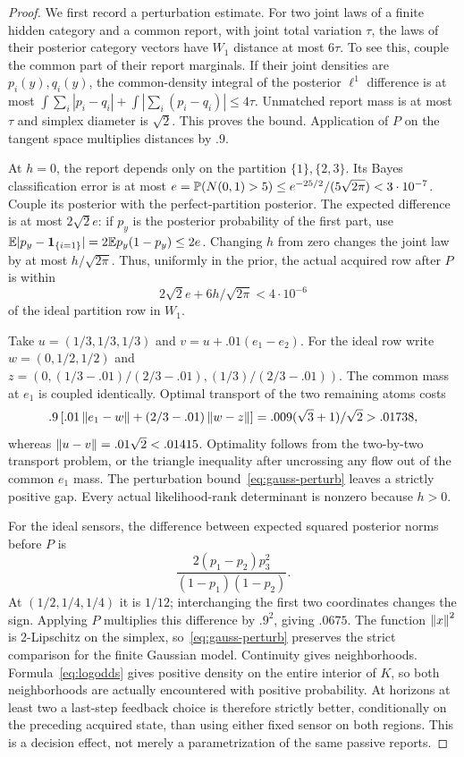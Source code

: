 \begin{proof}
We first record a perturbation estimate. For two joint laws of a finite hidden category and a common report, with joint total variation $\tau$, the laws of their posterior category vectors have $W_1$ distance at most $6\tau$. To see this, couple the common part of their report marginals. If their joint densities are $p_i(y),q_i(y)$, the common-density integral of the posterior $\ell^1$ difference is at most
$\int\sum_i|p_i-q_i|+\int|\sum_i(p_i-q_i)|\le4\tau$.
Unmatched report mass is at most $\tau$ and simplex diameter is $\sqrt2$. This proves the bound. Application of $P$ on the tangent space multiplies distances by $.9$.

At $h=0$, the report depends only on the partition $\{1\},\{2,3\}$. Its Bayes classification error is at most
$e=\mathbb P(N(0,1)>5)\le e^{-25/2}/(5\sqrt{2\pi})<3\cdot10^{-7}$.
Couple its posterior with the perfect-partition posterior. The expected difference is at most $2\sqrt2e$: if $p_y$ is the posterior probability of the first part, use $\mathbb E|p_y-\mathbf 1_{\{i=1\}}|=2\mathbb E p_y(1-p_y)\le2e$.
Changing $h$ from zero changes the joint law by at most $h/\sqrt{2\pi}$. Thus, uniformly in the prior, the actual acquired row after $P$ is within
\begin{equation}\label{eq:gauss-perturb}
 2\sqrt2 e+6h/\sqrt{2\pi}<4\cdot10^{-6}
\end{equation}
of the ideal partition row in $W_1$.

Take $u=(1/3,1/3,1/3)$ and $v=u+.01(e_1-e_2)$. For the ideal row write
$w=(0,1/2,1/2)$ and
$z=(0,(1/3-.01)/(2/3-.01),(1/3)/(2/3-.01))$.
The common mass at $e_1$ is coupled identically. Optimal transport of the two remaining atoms costs
\[
 .9\left[.01\left\lVert e_1-w\right\rVert+(2/3-.01)\left\lVert w-z\right\rVert\right]
 =.009(\sqrt3+1)/\sqrt2>.01738,
\]
whereas $\left\lVert u-v\right\rVert=.01\sqrt2<.01415$. Optimality follows from the two-by-two transport problem, or the triangle inequality after uncrossing any flow out of the common $e_1$ mass. The perturbation bound~\eqref{eq:gauss-perturb} leaves a strictly positive gap. Every actual likelihood-rank determinant is nonzero because $h>0$.

For the ideal sensors, the difference between expected squared posterior norms before $P$ is
\[
 \frac{2(p_1-p_2)p_3^2}{(1-p_1)(1-p_2)}.
\]
At $(1/2,1/4,1/4)$ it is $1/12$; interchanging the first two coordinates changes the sign. Applying $P$ multiplies this difference by $.9^2$, giving $.0675$. The function $\left\lVert x\right\rVert^2$ is 2-Lipschitz on the simplex, so~\eqref{eq:gauss-perturb} preserves the strict comparison for the finite Gaussian model. Continuity gives neighborhoods. Formula~\eqref{eq:logodds} gives positive density on the entire interior of $K$, so both neighborhoods are actually encountered with positive probability. At horizons at least two a last-step feedback choice is therefore strictly better, conditionally on the preceding acquired state, than using either fixed sensor on both regions. This is a decision effect, not merely a parametrization of the same passive reports.
\end{proof}

